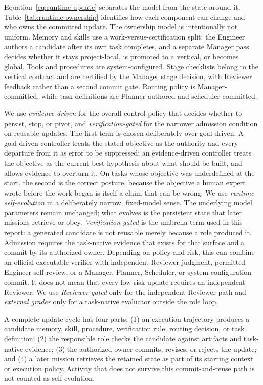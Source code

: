 Equation~\ref{eq:runtime-update} separates the model from the state around it.
Table~\ref{tab:runtime-ownership} identifies how each component can change and who
owns the committed update. The ownership model is intentionally not uniform. Memory
and skills use a work-versus-certification split: the Engineer authors a candidate
after its own task completes, and a separate Manager pass decides whether it stays
project-local, is promoted to a vertical, or becomes global. Tools and procedures are
system-configured. Stage checklists belong to the vertical contract and are certified
by the Manager stage decision, with Reviewer feedback rather than a second commit
gate. Routing policy is Manager-committed, while task
definitions are Planner-authored and scheduler-committed.

We use \emph{evidence-driven} for the overall control policy that decides whether to
persist, stop, or pivot, and \emph{verification-gated} for the narrower admission
condition on reusable updates. The first term is chosen deliberately over
goal-driven. A goal-driven controller treats the stated objective as the authority
and every departure from it as error to be suppressed; an evidence-driven controller
treats the objective as the current best hypothesis about what should be built, and
allows evidence to overturn it. On tasks whose objective was underdefined at the
start, the second is the correct posture, because the objective a human expert wrote
before the work began is itself a claim that can be wrong. We use \emph{runtime self-evolution} in a deliberately
narrow, fixed-model sense.
The underlying model parameters remain unchanged; what evolves is the persistent
state that later missions retrieve or obey. \emph{Verification-gated} is the
umbrella term used in this report: a
generated candidate is not reusable merely because a role produced it. Admission
requires the task-native evidence that exists for that surface and a commit by its
authorized owner. Depending on policy and risk, this can combine an official
executable verifier with independent Reviewer judgment, permitted Engineer
self-review, or a Manager, Planner, Scheduler, or system-configuration commit. It
does not mean that every low-risk update requires an independent Reviewer. We use
\emph{Reviewer-gated} only for the independent-Reviewer path and \emph{external
grader} only for a task-native evaluator outside the role loop.

A complete update cycle has four parts:
(1) an execution trajectory produces a candidate memory, skill, procedure,
verification rule, routing decision, or task definition; (2) the responsible role
checks the candidate against artifacts and task-native evidence; (3) the authorized
owner commits, revises, or rejects the update; and (4) a later mission retrieves the
retained state as part of its starting context or execution policy. Activity that
does not survive this commit-and-reuse path is not counted as self-evolution.

